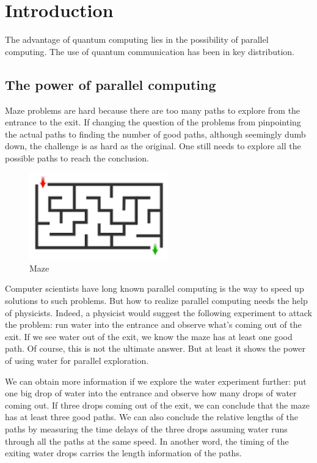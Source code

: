 \chapter{Introduction}
The advantage of quantum computing lies in the possibility of parallel computing. The use of quantum communication has been in key distribution.

\section{The power of parallel computing}
Maze problems are hard because there are too many paths to explore from the entrance to the exit. If changing the question of the problems from pinpointing the actual paths to finding the number of good paths, although seemingly dumb down, the challenge is as hard as the original. One still needs to explore all the possible paths to reach the conclusion.

\begin{figure}[ht]
\includegraphics[width=6cm]{pic/maze.png}
\caption{Maze}
\label{Maze}
\end{figure}

Computer scientists have long known parallel computing is the way to speed up solutions to such problems. But how to realize parallel computing needs the help of physicists. Indeed, a physicist would suggest the following experiment to attack the problem: run water into the entrance and observe what's coming out of the exit. If we see water out of the exit, we know the maze has at least one good path. Of course, this is not the ultimate answer. But at least it shows the power of using water for parallel exploration.

We can obtain more information if we explore the water experiment further: put one big drop of water into the entrance and observe how many drops of water coming out. If three drops coming out of the exit, we can conclude that the maze has at least three good paths. We can also conclude the relative lengths of the paths by measuring the time delays of the three drops assuming water runs through all the paths at the same speed. In another word, the timing of the exiting water drops carries the length information of the paths.

